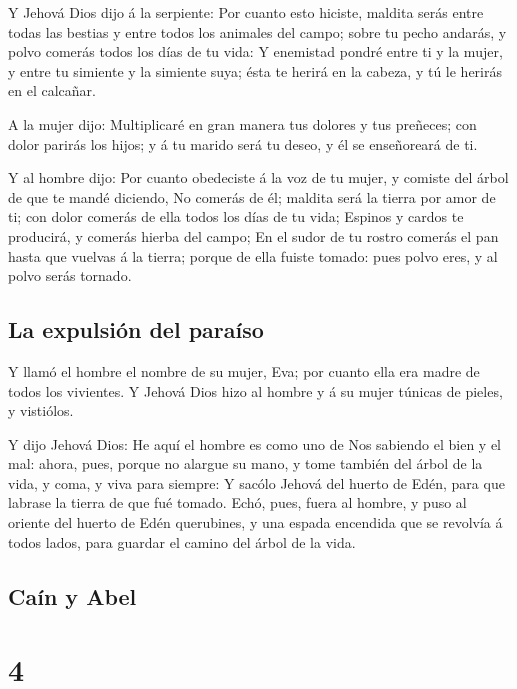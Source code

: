  Y Jehová Dios dijo á la serpiente: Por cuanto esto
hiciste, maldita serás entre todas las bestias y entre todos los
animales del campo; sobre tu pecho andarás, y polvo comerás todos los
días de tu vida:  Y enemistad pondré entre ti y la mujer, y
entre tu simiente y la simiente suya; ésta te herirá en la cabeza, y tú
le herirás en el calcañar.

 A la mujer dijo: Multiplicaré en gran manera tus dolores y
tus preñeces; con dolor parirás los hijos; y á tu marido será tu deseo,
y él se enseñoreará de ti.

 Y al hombre dijo: Por cuanto obedeciste á la voz de tu
mujer, y comiste del árbol de que te mandé diciendo, No comerás de él;
maldita será la tierra por amor de ti; con dolor comerás de ella todos
los días de tu vida;  Espinos y cardos te producirá, y
comerás hierba del campo;  En el sudor de tu rostro comerás
el pan hasta que vuelvas á la tierra; porque de ella fuiste tomado: pues
polvo eres, y al polvo serás tornado.

\hypertarget{la-expulsiuxf3n-del-parauxedso}{%
\subsection{La expulsión del
paraíso}\label{la-expulsiuxf3n-del-parauxedso}}

 Y llamó el hombre el nombre de su mujer, Eva; por cuanto
ella era madre de todos los vivientes.  Y Jehová Dios hizo
al hombre y á su mujer túnicas de pieles, y vistiólos.

 Y dijo Jehová Dios: He aquí el hombre es como uno de Nos
sabiendo el bien y el mal: ahora, pues, porque no alargue su mano, y
tome también del árbol de la vida, y coma, y viva para siempre:
 Y sacólo Jehová del huerto de Edén, para que labrase la
tierra de que fué tomado.  Echó, pues, fuera al hombre, y
puso al oriente del huerto de Edén querubines, y una espada encendida
que se revolvía á todos lados, para guardar el camino del árbol de la
vida.

\hypertarget{cauxedn-y-abel}{%
\subsection{Caín y Abel}\label{cauxedn-y-abel}}

\hypertarget{section-3}{%
\section{4}\label{section-3}}

